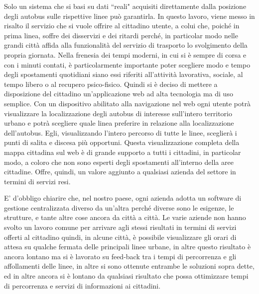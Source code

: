 Solo un sistema che si basi su dati ``reali" acquisiti direttamente dalla posizione degli autobus sulle rispettive linee può garantirla.
In questo lavoro, viene messo in risalto il servizio che si vuole offrire al cittadino utente, a colui che, poiché in prima linea, soffre dei disservizi e dei ritardi perché, in particolar modo nelle grandi città affida alla funzionalità del servizio di trasporto lo svolgimento della propria giornata. Nella frenesia dei tempi moderni, in cui si è sempre di corsa e con i minuti contati, è particolarmente importante poter scegliere modo e tempo degli spostamenti quotidiani siano essi riferiti all’attività lavorativa, sociale, al tempo libero o al recupero psico-fisico. Quindi si è deciso di mettere a disposizione del cittadino un’applicazione web ad alta tecnologia  ma di uso semplice.  Con un dispositivo abilitato alla navigazione nel web ogni utente potrà visualizzare la localizzazione degli autobus di interesse sull’intero territorio urbano e potrà scegliere quale linea preferire in relazione alla localizzazione dell’autobus. Egli, visualizzando l’intero percorso di tutte le linee, sceglierà i punti di salita e discesa più opportuni. Questa visualizzazione completa della mappa cittadina sul web è di grande supporto a tutti i cittadini, in particolar modo, a coloro che non sono esperti degli spostamenti all’interno della aree cittadine. Offre, quindi, un valore aggiunto a qualsiasi azienda del settore in termini di servizi resi.

E’ d’obbligo chiarire che, nel nostro paese, ogni azienda adotta un software di gestione centralizzata diverso da un’altra perché diverse sono le esigenze, le strutture, e tante altre cose ancora da città a città. Le varie aziende non hanno svolto un lavoro comune per arrivare agli stessi risultati in  termini di servizi offerti al cittadino quindi, in alcune città, è possibile visualizzare gli orari di attesa su qualche fermata delle principali linee urbane, in altre questo risultato è ancora lontano ma si è lavorato su feed-back tra i tempi di percorrenza e gli affollamenti delle linee, in altre si sono ottenute entrambe le soluzioni sopra dette, ed in altre ancora si è lontano da  qualsiasi risultato che possa ottimizzare tempi di percorrenza e servizi di informazioni ai cittadini.

